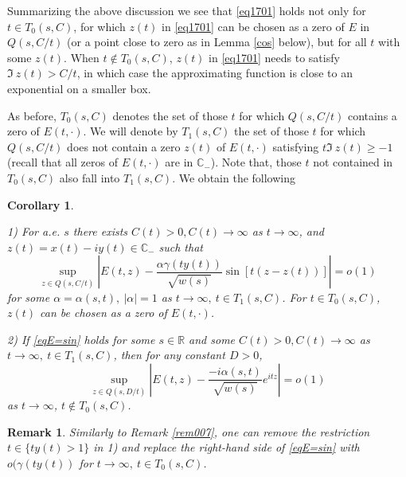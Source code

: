 \documentclass[11pt,twoside,reqno]{amsart}
\def\to{\rightarrow}
\def\R{{\mathbb R}}
\def\C{{\mathbb{C}}}
\def\g{\gamma}
\def\a{\alpha}
\theoremstyle{plain}
\newtheorem{corollary}{Corollary}
\newtheorem{remark}{Remark}
\numberwithin{equation}{section}
\begin{document}
Summarizing the above discussion
we see that \eqref{eq1701} holds not only for $t\in T_0(s,C)$, for which $z(t)$ in \eqref{eq1701} can be chosen as a zero of
$E$ in $Q(s,C/t)$ (or a point close to zero as in Lemma \ref{cos} 
 below), but for all $t$ with some $z(t)$. When $t\not\in T_0(s,C)$,
$z(t)$ in \eqref{eq1701} needs to satisfy $\Im\  z(t)>C/t$, in which case the approximating function is close to an exponential on a smaller box.

As before, $T_0(s,C)$ denotes the set of those $t$ for which $Q(s,C/t)$ contains a zero of $E(t,\cdot)$.
We will denote by $T_1(s,C)$ the set of those $t$ for which $Q(s,C/t)$ does not contain a zero $z(t)$ of $E(t,\cdot)$
satisfying $t\Im\  z(t)\geq -1$ (recall that all zeros of $E(t,\cdot)$ are in $\C_-$). Note that,
those $t$ not contained in  $ T_0(s,C)$ also fall into $T_1(s,C)$.
We obtain the following

\begin{corollary}\label{cor02}

1) For a.e. $s$ there exists $C(t)>0, C(t)\to\infty$ as $t\to\infty$, and  $z(t)=x(t)-iy(t)\in \C_-$ such that
\begin{equation}\sup_{z\in Q(s,C/t)}\left| E(t,z)- \frac {\a\g(ty(t))}{\sqrt{w(s)}}\sin [t(z - z(t))]\right|=o(1)\label{eqE=sin}\end{equation}
for some  $\a=\a(s,t), \  |\a |=1$ as $t\to\infty,\ t\in T_1(s,C)$. For $t\in T_0(s,C)$, $z(t)$ can be chosen as a zero of $E(t,\cdot)$.


2) If \eqref{eqE=sin} holds for some $s\in \R$ and some $C(t)>0, C(t)\to\infty$ as $t\to\infty,\ t\in T_1(s,C)$, then for any constant $D>0$,
\begin{equation}\sup_{z\in Q(s,D/t)}\left| E(t,z)- \frac {-i\a(s,t)}{\sqrt{w(s)}}e^{itz}\right|=o(1)\label{eqE=sin1}\end{equation}
as $t\to\infty$, $t\not\in T_0(s,C)$.
\end{corollary}


\begin{remark}\label{rem008}
Similarly to Remark \ref{rem007}, one can remove the restriction $t\in\{ty(t)>1\}$ in 1) and replace the right-hand side of \eqref{eqE=sin}
with  $o(\g(ty(t))$ for $t\to\infty,\ t\in T_0(s,C)$.
\end{remark}
\end{document}
